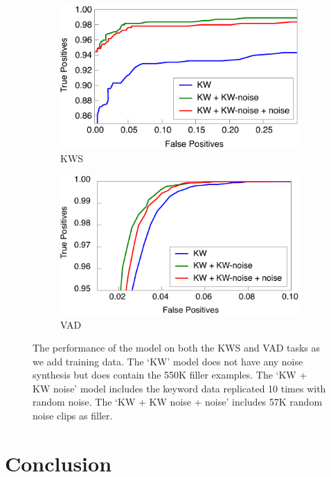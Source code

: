 \begin{figure}
\centering
\begin{subfigure}{0.47\textwidth}
    \includegraphics[width=\textwidth]{kws/figures/data.pdf}
    \caption{KWS}
\end{subfigure}
\hfill
\begin{subfigure}{0.47\textwidth}
    \includegraphics[width=\textwidth]{kws/figures/data_vad.pdf}
    \caption{VAD}
\end{subfigure}
\caption{The performance of the model on both the KWS and VAD tasks as we add
         training data. The `KW' model does not have any noise synthesis but does
         contain the 550K filler examples. The `KW + KW noise' model includes
         the keyword data replicated 10 times with random noise. The `KW + KW noise
         + noise' includes 57K random noise clips as filler.}
\label{fig:kws:data} 
\end{figure}

\section{Conclusion}
\label{sec:kws:conclusion}

